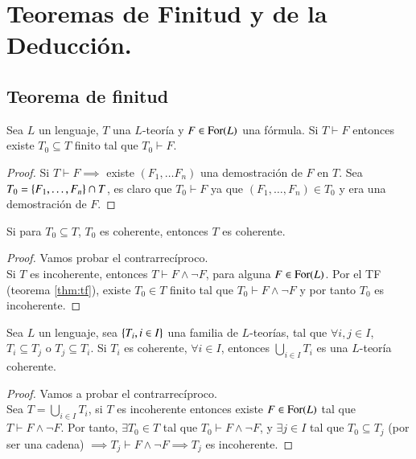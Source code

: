 
\chapter{Teoremas de Finitud y de la Deducci\'on.}

\section{Teorema de finitud}

\begin{thm}\label{thm:tf}
    Sea $L$ un lenguaje, $T$ una $L$-teoría y $F \in \mathrm{For}(L)$ una fórmula. Si $T \vdash F$ entonces existe $T_0 \subseteq T$ finito tal que $T_0 \vdash F$.
\end{thm}

\begin{proof}
    Si $T \vdash F \implies$ existe $(F_1, \ldots F_n)$ una demostración de $F$ en $T$. Sea $T_0 = \left\{F_1, \ldots, F_n\right\} \cap T$, es claro que $T_0 \vdash F$ ya que $(F_1, \ldots, F_n) \in T_0$ y era una demostración de $F$.
\end{proof}

\begin{cor}\label{cor:tf1}
    Si para $T_0 \subseteq T$, $T_0$ es coherente, entonces $T$ es coherente.
\end{cor}

\begin{proof}
    Vamos probar el contrarrecíproco.\\
    Si $T$ es incoherente, entonces $T \vdash F \land \neg F$, para alguna $F \in \mathrm{For}(L)$. Por el TF (teorema \ref{thm:tf}), existe $T_0 \in T$ finito tal que $T_0 \vdash F \land \neg F$ y por tanto $T_0$ es incoherente.
\end{proof}

\begin{cor}
    Sea $L$ un lenguaje, sea $\left\{T_i, i\in I\right\}$ una familia de $L$-teorías, tal que $\forall i, j\in I$, $T_i \subseteq T_j$ o $T_j \subseteq T_i$. Si $T_i$ es coherente, $\forall i \in I$, entonces $\bigcup_{i\in I} T_i$ es una $L$-teoría coherente.
\end{cor}

\begin{proof}
    Vamos a probar el contrarrecíproco.\\
    Sea $T = \bigcup_{i\in I} T_i$, si $T$ es incoherente entonces existe $F \in \mathrm{For}(L)$ tal que $T \vdash F \land \neg F$. Por tanto, $\exists T_0 \in T$ tal que $T_0 \vdash F \land \neg F$, y $\exists j \in I$ tal que $T_0 \subseteq T_j$ (por ser una cadena) $\implies T_j \vdash F \land \neg F \implies T_j$ es incoherente.
\end{proof}

